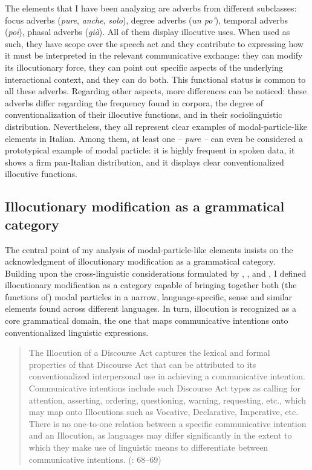 The elements that I have been analyzing are adverbs from different subclasses: focus adverbs (\textit{pure}, \textit{anche}, \textit{solo}), degree adverbs (\textit{un po’}), temporal adverbs (\textit{poi}), phasal adverbs (\textit{già}). All of them display illocutive uses. When used as such, they have scope over the speech act and they contribute to expressing how it must be interpreted in the relevant communicative exchange: they can modify its illocutionary force, they can point out specific aspects of the underlying interactional context, and they can do both. This functional status is common to all these adverbs. Regarding other aspects, more differences can be noticed: these adverbs differ regarding the frequency found in corpora, the degree of conventionalization of their illocutive functions, and in their sociolinguistic distribution. Nevertheless, they all represent clear examples of modal-particle-like elements in Italian. Among them, at least one – \textit{pure –} can even be considered a prototypical example of modal particle: it is highly frequent in spoken data, it shows a firm pan-Italian distribution, and it displays clear conventionalized illocutive functions.

\subsection{Illocutionary modification as a grammatical category}
\hypertarget{Toc124860697}{}
The central point of my analysis of modal-particle-like elements insists on the acknowledgment of illocutionary modification as a grammatical category. Building upon the cross-linguistic considerations formulated by \citet{Waltereit2001,Waltereit2006}, \citet{Hengeveld2004}, \citet{HengeveldMackenzie2008} and \citet{Narrog2012}, I defined illocutionary modification as a category capable of bringing together both (the functions of) modal particles in a narrow, language-specific, sense and similar elements found across different languages. In turn, illocution is recognized as a core grammatical domain, the one that maps communicative intentions onto conventionalized linguistic expressions.

\begin{quote}
The Illocution of a Discourse Act captures the lexical and formal properties of that Discourse Act that can be attributed to its conventionalized interpersonal use in achieving a communicative intention. Communicative intentions include such Discourse Act types as calling for attention, asserting, ordering, questioning, warning, requesting, etc., which may map onto Illocutions such as Vocative, Declarative, Imperative, etc. There is no one-to-one relation between a specific communicative intention and an Illocution, as languages may differ significantly in the extent to which they make use of linguistic means to differentiate between communicative intentions. (\citealt{HengeveldMackenzie2008}: 68–69)
\end{quote}

